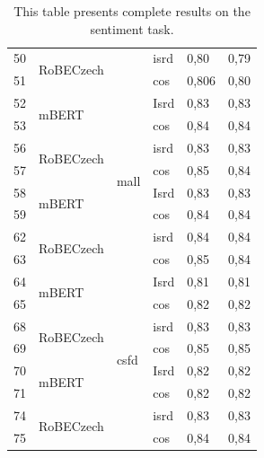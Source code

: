 \begin{table}[]
{\begin{tabular}{|l|l|l|l||ll|}
50 & \multirow{2}{*}{RoBECzech} &                           & isrd                  & 0,80   & 0,79 \\ \cline{1-1} \cline{4-6} 
51 &                            &                           & cos                   & 0,806  & 0,80 \\ \hline
52 & \multirow{2}{*}{mBERT}     & \multirow{8}{*}{mall}     & Isrd                  & 0,83   & 0,83 \\ \cline{1-1} \cline{4-6} 
53 &                            &                           & cos                   & 0,84   & 0,84 \\ \cline{1-2} \cline{4-6} 
56 & \multirow{2}{*}{RoBECzech} &                           & isrd                  & 0,83   & 0,83 \\ \cline{1-1} \cline{4-6} 
57 &                            &                           & cos                   & 0,85   & 0,84 \\ \cline{1-2} \cline{4-6} 
58 & \multirow{2}{*}{mBERT}     &                           & Isrd                  & 0,83   & 0,83 \\ \cline{1-1} \cline{4-6} 
59 &                            &                           & cos                   & 0,84   & 0,84 \\ \cline{1-2} \cline{4-6} 
62 & \multirow{2}{*}{RoBECzech} &                           & isrd                  & 0,84   & 0,84 \\ \cline{1-1} \cline{4-6} 
63 &                            &                           & cos                   & 0,85   & 0,84 \\ \hline
64 & \multirow{2}{*}{mBERT}     & \multirow{8}{*}{csfd}     & Isrd                  & 0,81   & 0,81 \\ \cline{1-1} \cline{4-6} 
65 &                            &                           & cos                   & 0,82   & 0,82 \\ \cline{1-2} \cline{4-6} 
68 & \multirow{2}{*}{RoBECzech} &                           & isrd                  & 0,83   & 0,83 \\ \cline{1-1} \cline{4-6} 
69 &                            &                           & cos                   & 0,85   & 0,85 \\ \cline{1-2} \cline{4-6} 
70 & \multirow{2}{*}{mBERT}     &                           & Isrd                  & 0,82   & 0,82 \\ \cline{1-1} \cline{4-6} 
71 &                            &                           & cos                   & 0,82   & 0,82 \\ \cline{1-2} \cline{4-6} 
74 & \multirow{2}{*}{RoBECzech} &                           & isrd                  & 0,83   & 0,83 \\ \cline{1-1} \cline{4-6} 
75 &                            &                           & cos                   & 0,84   & 0,84 \\ \hline
\end{tabular}}
\caption{This table presents complete results on the sentiment task. }
\label{tab:res_all_sent}
\end{table}

